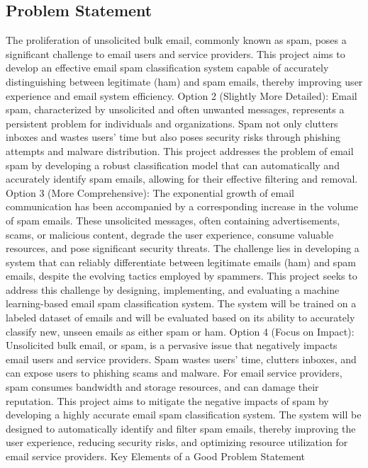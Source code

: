 \documentclass[11pt]{article}
\begin{document}
    \subsection{Problem Statement}
    \label{subsec:problem}
    The proliferation of unsolicited bulk email, commonly known as spam, poses a significant challenge to email users and service providers. This project aims to develop an effective email spam classification system capable of accurately distinguishing between legitimate (ham) and spam emails, thereby improving user experience and email system efficiency. Option 2 (Slightly More Detailed): Email spam, characterized by unsolicited and often unwanted messages, represents a persistent problem for individuals and organizations. Spam not only clutters inboxes and wastes users' time but also poses security risks through phishing attempts and malware distribution. This project addresses the problem of email spam by developing a robust classification model that can automatically and accurately identify spam emails, allowing for their effective filtering and removal. Option 3 (More Comprehensive): The exponential growth of email communication has been accompanied by a corresponding increase in the volume of spam emails. These unsolicited messages, often containing advertisements, scams, or malicious content, degrade the user experience, consume valuable resources, and pose significant security threats. The challenge lies in developing a system that can reliably differentiate between legitimate emails (ham) and spam emails, despite the evolving tactics employed by spammers. This project seeks to address this challenge by designing, implementing, and evaluating a machine learning-based email spam classification system. The system will be trained on a labeled dataset of emails and will be evaluated based on its ability to accurately classify new, unseen emails as either spam or ham. Option 4 (Focus on Impact): Unsolicited bulk email, or spam, is a pervasive issue that negatively impacts email users and service providers. Spam wastes users' time, clutters inboxes, and can expose users to phishing scams and malware. For email service providers, spam consumes bandwidth and storage resources, and can damage their reputation. This project aims to mitigate the negative impacts of spam by developing a highly accurate email spam classification system. The system will be designed to automatically identify and filter spam emails, thereby improving the user experience, reducing security risks, and optimizing resource utilization for email service providers. Key Elements of a Good Problem Statement
\end{document}
